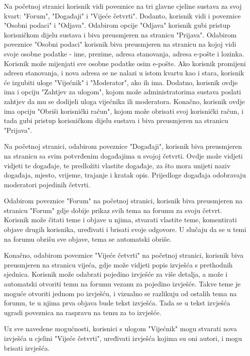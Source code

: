 	Na početnoj stranici korisnik vidi poveznice na tri glavne cjeline sustava za svoj kvart: "Forum", "Događaji" i "Vijeće četvrti". Dodanto, korisnik vidi i poveznice "Osobni podaci" i "Odjava". Odabirom opcije "Odjava" korisnik gubi pristup korisničkom dijelu sustava i biva preusmjeren na stranicu "Prijava". Odabirom poveznice "Osobni podaci" korisnik biva preusmjeren na stranicu na kojoj vidi svoje osobne podatke - ime, prezime, adresa stanovanja, adresa e-pošte i lozinka. Korisnik može mijenjati sve osobne podatke osim e-pošte. Ako korisnik promijeni adresu stanovanja, i nova adresa se ne nalazi u istom kvartu kao i stara, korisnik će izgubiti uloge "Vijećnik" i "Moderator", ako ih ima. Dodatno, korisnik ovdje ima i opciju "Zahtjev za ulogom", kojom može administratorima sustava poslati zahtjev da mu se dodijeli uloga vijećnika ili moderatora. Konačno, korisnik ovdje ima opciju "Obriši korisnički račun", kojom može obrisati svoj korisnički račun, i tada gubi pristup korisničkom dijelu sustava i biva preusmjeren na stranicu "Prijava". 
	
	Na početnoj stranici, odabirom poveznice "Događaji", korisnik biva preusmjeren na stranicu sa svim potvrđenim događajima u svojoj četvrti. Ovdje može vidjeti vidjeti te događaje, te predložiti vlastite događaje, za što mora unijeti naziv događaja, mjesto, vrijeme, trajanje i kratak opis. Prijedloge događaja odobravaju moderatori pojedinih četvrti.
	
	Odabirom poveznice "Forum" na početnoj stranici, korisnik biva preusmjeren na stranicu "Forum" gdje dobije prikaz svih tema na forumu za svoju četvrt. Korisnik može čitati teme i objave u njima, stvarati vlastite teme, komentirati objave drugih korisnika, uređivati i brisati svoje odgovore. U slučaju da se u temi na forumu obrišu sve objave, tema se automatski obriše. 
	
	Konačno, odabirom poveznice "Vijeće četvrti" na početnoj stranici, korisnik biva preusmjeren na stranicu vijeća, gdje može vidjeti popis izvješća s prethodnih sjednica. Korisnik može odabrati pojedino izvješće za više detalja, a može i automatski otvoriti temu na forumu vezanu za pojedino izvješće. Takve teme je moguće otvoriti jednom po izvješću, i vizualno se razlikuju od ostalih tema na forumu, te u njima prva objava bude tekst izvješća. Tada se u tekst izvješća ugradi poveznica na raspravu na temu za to izvješće.
	
	Uz sve navedene mogućnosti, korisnici s ulogom "Vijećnik" mogu stvarati nova izvješća u cjelini "Vijeće četvrti", uređivati izvješća kojima su oni autori, i mogu brisati izvješća.